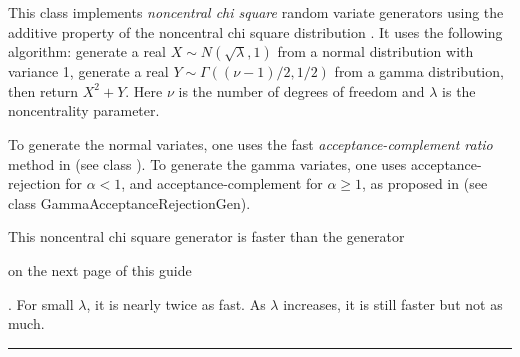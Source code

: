 
This class implements {\em noncentral chi square\/} random variate generators 
using the additive property of the noncentral chi square distribution
\cite{tKRI06a}. It uses the following algorithm: generate a real
 $X \sim N(\sqrt\lambda, 1)$ from a normal distribution with variance 1, 
generate a real $Y \sim \Gamma((\nu - 1)/2, 1/2)$ from a gamma distribution,
then return $X^2 + Y$. Here $\nu$ is the number of degrees of freedom and 
$\lambda$ is the noncentrality parameter.

To generate the normal variates, one uses the fast 
\emph{acceptance-complement ratio} method in \cite{rHOR90a}
(see class ).
To generate the gamma variates, one uses acceptance-rejection for $\alpha<1$,
and acceptance-complement for $\alpha\ge 1$, as proposed in \cite{rAHR72b,rAHR82a}
(see class 
{GammaAcceptanceRejectionGen}).

This noncentral chi square generator is faster than the generator 
\begin{latexonly}on the next page of this guide\end{latexonly}.
For small $\lambda$, it is nearly twice as fast. As $\lambda$ increases, 
it is still faster but not as much.


\bigskip\hrule

